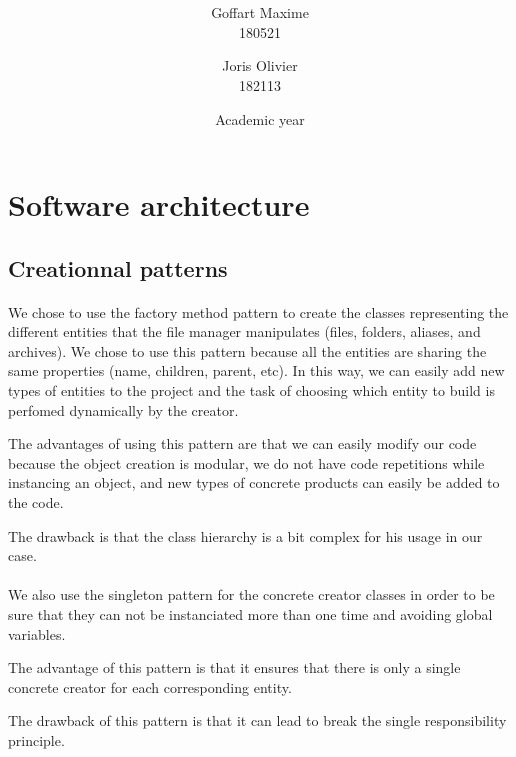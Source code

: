 \documentclass[a4paper, 11pt, oneside]{article}
\title{\ClassName\\\vspace*{0.8cm}\ProjectName\vspace{0.8cm}}
\author{Goffart Maxime \\180521 \and Joris Olivier \\ 182113}
\date{\vspace{1cm}Academic year \AcademicYear}
\begin{document}
\begin{titlingpage}
{\let\newpage\relax\maketitle}
\end{titlingpage}


\section{Software architecture}

\subsection{Creationnal patterns}

\paragraph{}We chose to use the factory method pattern to create the classes representing the different entities that the file manager manipulates (files, folders, aliases, and archives).
We chose to use this pattern because all the entities are sharing the same properties (name, children, parent, etc). In this way,  we can easily add new types of entities to the project and the task of choosing which entity to build is perfomed dynamically by the creator.

The advantages of using this pattern are that we can easily modify our code because the object creation is modular, we do not have code repetitions while instancing an object, and new types of concrete products can easily be added to the code.

The drawback is that the class hierarchy is a bit complex for his usage in our case.

\paragraph{}We also use the singleton pattern for the concrete creator classes in order to be sure that they can not be instanciated more than one time and avoiding global variables.

The advantage of this pattern is that it ensures that there is only a single concrete creator for each corresponding entity.

The drawback of this pattern is that it can lead to break the single responsibility principle.
\end{document}
